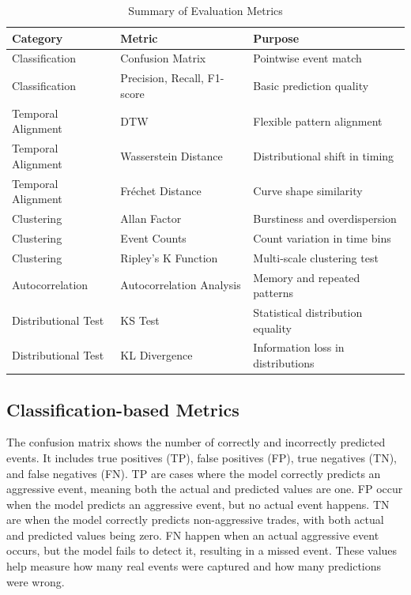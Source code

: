 \begin{table}[h]
\centering
\begin{tabular}{|l|l|l|}
\hline
\textbf{Category} & \textbf{Metric} & \textbf{Purpose} \\
\hline
Classification & Confusion Matrix & Pointwise event match \\
Classification & Precision, Recall, F1-score & Basic prediction quality \\
Temporal Alignment & DTW & Flexible pattern alignment \\
Temporal Alignment & Wasserstein Distance & Distributional shift in timing \\
Temporal Alignment & Fréchet Distance & Curve shape similarity \\
Clustering & Allan Factor & Burstiness and overdispersion \\
Clustering & Event Counts & Count variation in time bins \\
Clustering & Ripley's K Function & Multi-scale clustering test \\
Autocorrelation & Autocorrelation Analysis & Memory and repeated patterns \\
Distributional Test & KS Test & Statistical distribution equality \\
Distributional Test & KL Divergence & Information loss in distributions \\
\hline
\end{tabular}
\caption{Summary of Evaluation Metrics}\label{tb:Evaluation Metrics}
\end{table}

\subsection{Classification-based Metrics}
The confusion matrix shows the number of correctly and incorrectly predicted events. It includes true positives (TP), false positives (FP), true negatives (TN), and false negatives (FN). TP are cases where the model correctly predicts an aggressive event, meaning both the actual and predicted values are one. FP occur when the model predicts an aggressive event, but no actual event happens. TN are when the model correctly predicts non-aggressive trades, with both actual and predicted values being zero. FN happen when an actual aggressive event occurs, but the model fails to detect it, resulting in a missed event. These values help measure how many real events were captured and how many predictions were wrong.

